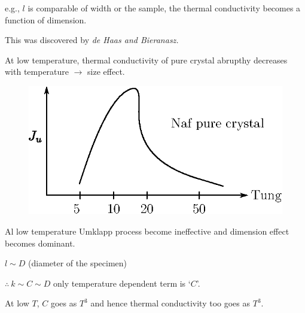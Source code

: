 e.g., $l$ is comparable of width or the sample, the thermal conductivity becomes a function of dimension.

This was discovered by {\em de Haas and Bieranasz.}

At low temperature, thermal conductivity of pure crystal abrupthy decreases with temperature $\to$ size effect.
\begin{figure}[H]
\centering
\includegraphics{images/lecture20/fig6.eps}
\end{figure}

Al low temperature Umklapp process become ineffective and dimension effect becomes dominant.

$l\sim D$ (diameter of the specimen)

$\therefore \ k\sim C\sim D$ only temperature dependent term is `$C$'.

At low $T$, $C$ goes as $T^{3}$ and hence thermal conductivity too goes as $T^{3}$.
